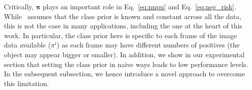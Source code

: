 Critically, $\bm{\pi}$ plays an important role in Eq.~\eqref{eq:nnpu} and Eq.~\eqref{eq:neg_risk}. While~\cite{kiryo17} assumes that the class prior is known and constant across all the data, this is not the case in many applications, including the one at the heart of this work. In particular, the class prior here is specific to each frame of the image data available (\ie $\pi^i$) as each frame may have different numbers of positives (\eg the object may appear bigger or smaller). In addition, we show in our experimental section that setting the class prior in naive ways leads to low performance levels. In the subsequent subsection, we hence introduce a novel approach to overcome this limitation.


